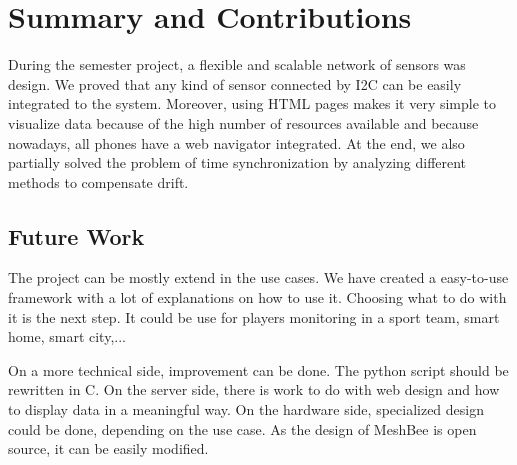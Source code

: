 \section{Summary and Contributions}
\label{s:SummaryAndContributions}

During the semester project, a flexible and scalable network of sensors was design. We proved that any kind of sensor connected by I2C can be easily integrated to the system. Moreover, using HTML pages makes it very simple to visualize data because of the high number of resources available and because nowadays, all phones have a web navigator integrated. At the end, we also partially solved the problem of time synchronization by analyzing different methods to compensate drift.

\subsection{Future Work}
\label{s:FutureWork}

The project can be mostly extend in the use cases. We have created a easy-to-use framework with a lot of explanations on how to use it. Choosing what to do with it is the next step. It could be use for players monitoring in a sport team, smart home, smart city,...

On a more technical side, improvement can be done. The python script should be rewritten in C. On the server side, there is work to do with web design and how to display data in a meaningful way. On the hardware side, specialized design could be done, depending on the use case. As the design of MeshBee is open source, it can be easily modified. 
